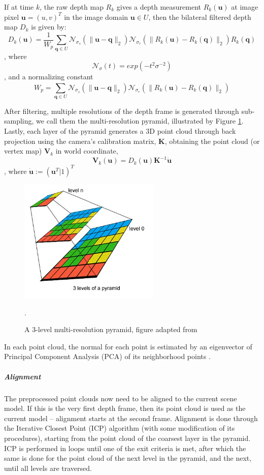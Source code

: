 \documentclass{ut-thesis}
\begin{document}
If at time \(k\), the raw depth map \( R_k \) gives a depth measurement \( R_k(\textbf{u}) \) at image pixel \( \textbf{u} = (u,v)^T \) in the image domain \( \textbf{u} \in U \), then the bilateral filtered depth map \( D_k \) is given by:
\[  D_k(\textbf{u}) = \frac{1}{W_p} \sum_{\textbf{q} \in U}^{} \mathcal{N}_{\sigma_s}(\| \textbf{u} - \textbf{q} \|_2)  \mathcal{N}_{\sigma_r}(\| R_k(\textbf{u}) - R_k(\textbf{q}) \|_2) R_k(\textbf{q})  \]
, where 
\[ \mathcal{N}_{\sigma}(t) = exp(-t^2 \sigma^{-2}) \]
, and a normalizing constant 
\[  W_p = \sum_{\textbf{q} \in U}^{} \mathcal{N}_{\sigma_s}(\| \textbf{u} - \textbf{q} \|_2)  \mathcal{N}_{\sigma_r}(\| R_k(\textbf{u}) - R_k(\textbf{q}) \|_2)  \] 

After filtering, multiple resolutions of the depth frame is generated through sub-sampling, we call them the multi-resolution pyramid, illustrated by Figure \ref{fig:resolutionPyramid}.  Lastly, each layer of the pyramid generates a 3D point cloud through back projection using the camera's calibration matrix, \(\textbf{K}\), obtaining the point cloud (or vertex map) \(\textbf{V}_k\) in world coordinate,
\[  \textbf{V}_k(\textbf{u}) = D_k(\textbf{u}) \textbf{K}^{-1} \dot{\textbf{u}} \]
, where \( \dot{\textbf{u}} := (\textbf{u}^T|1)^T \)
\begin{figure} [h]
	\centering
	\includegraphics[width=0.6\textwidth]{./img/resolution_pyramid.jpg}
	\caption{A 3-level multi-resolution pyramid, figure adapted from \cite{pirovano2011kinfu}}.
	\label{fig:resolutionPyramid}
\end{figure}

In each point cloud, the normal for each point is estimated by an eigenvector of Principal Component Analysis (PCA) of its neighborhood points \cite{pirovano2011kinfu}.


\subparagraph{Alignment}
The preprocessed point clouds now need to be aligned to the current scene model.  If this is the very first depth frame, then its point cloud is used as the current model -- alignment starts at the second frame.  Alignment is done through the Iterative Closest Point (ICP) algorithm (with some modification of its procedures), starting from the point cloud of the coarsest layer in the pyramid.  ICP is performed in loops until one of the exit criteria is met, after which the same is done for the point cloud of the next level in the pyramid, and the next, until all levels are traversed.
\end{document}
